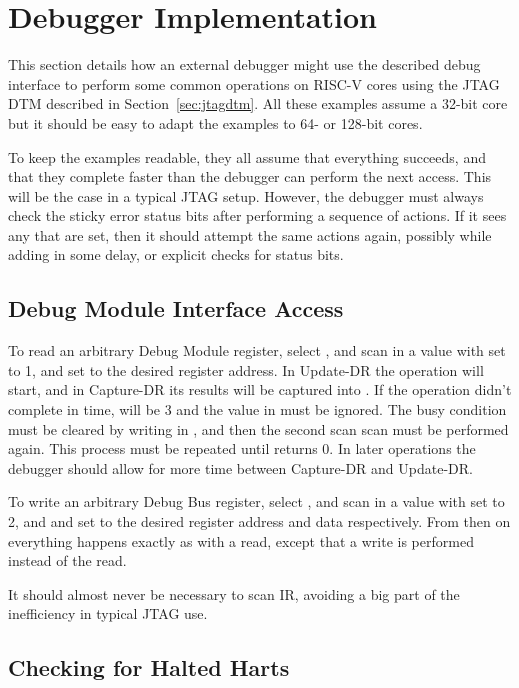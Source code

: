 \chapter{Debugger Implementation}

This section details how an external debugger might use the described debug
interface to perform some common operations on RISC-V cores using the JTAG DTM
described in Section~\ref{sec:jtagdtm}.
All these examples assume a 32-bit core but it should be easy to adapt the
examples to 64- or 128-bit cores.

To keep the examples readable, they all assume that everything succeeds, and
that they complete faster than the debugger can perform the next access. This
will be the case in a typical JTAG setup. However, the debugger must always
check the sticky error status bits after performing a sequence of actions. If
it sees any that are set, then it should attempt the same actions again,
possibly while adding in some delay, or explicit checks for status bits.

\section{Debug Module Interface Access} \label{dmiaccess}

To read an arbitrary Debug Module register, select \Rdmi, and scan in a value
with \Fop set to 1, and \Faddress set to the desired register address. In
Update-DR the operation will start, and in Capture-DR its results will be
captured into \Fdata.  If the operation didn't complete in time, \Fop will be 3
and the value in \Fdata must be ignored. The busy condition must be cleared by
writing \Fdmireset in \Rdtmcs, and then the second scan scan must be performed again.
This process must be repeated until \Fop returns 0.
In later operations the debugger should allow for more time between Capture-DR and
Update-DR.

To write an arbitrary Debug Bus register, select \Rdmi, and scan in a value
with \Fop set to 2, and \Faddress and \Fdata set to the desired register
address and data respectively. From then on everything happens exactly as with
a read, except that a write is performed instead of the read.

It should almost never be necessary to scan IR, avoiding a big part of the
inefficiency in typical JTAG use.

\section{Checking for Halted Harts}

